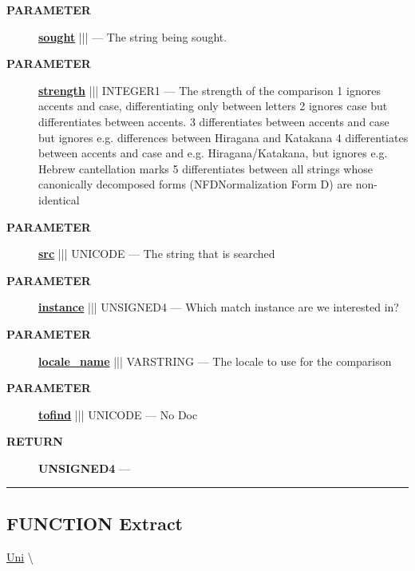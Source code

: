 \par
\begin{description}
\item [\colorbox{tagtype}{\color{white} \textbf{\textsf{PARAMETER}}}] \textbf{\underline{sought}} |||  --- The string being sought.
\item [\colorbox{tagtype}{\color{white} \textbf{\textsf{PARAMETER}}}] \textbf{\underline{strength}} ||| INTEGER1 --- The strength of the comparison 1 ignores accents and case, differentiating only between letters 2 ignores case but differentiates between accents. 3 differentiates between accents and case but ignores e.g. differences between Hiragana and Katakana 4 differentiates between accents and case and e.g. Hiragana/Katakana, but ignores e.g. Hebrew cantellation marks 5 differentiates between all strings whose canonically decomposed forms (NFDNormalization Form D) are non-identical
\item [\colorbox{tagtype}{\color{white} \textbf{\textsf{PARAMETER}}}] \textbf{\underline{src}} ||| UNICODE --- The string that is searched
\item [\colorbox{tagtype}{\color{white} \textbf{\textsf{PARAMETER}}}] \textbf{\underline{instance}} ||| UNSIGNED4 --- Which match instance are we interested in?
\item [\colorbox{tagtype}{\color{white} \textbf{\textsf{PARAMETER}}}] \textbf{\underline{locale\_name}} ||| VARSTRING --- The locale to use for the comparison
\item [\colorbox{tagtype}{\color{white} \textbf{\textsf{PARAMETER}}}] \textbf{\underline{tofind}} ||| UNICODE --- No Doc
\end{description}







\par
\begin{description}
\item [\colorbox{tagtype}{\color{white} \textbf{\textsf{RETURN}}}] \textbf{UNSIGNED4} --- 
\end{description}




\rule{\linewidth}{0.5pt}
\subsection*{\textsf{\colorbox{headtoc}{\color{white} FUNCTION}
Extract}}

\hypertarget{ecldoc:uni.extract}{}
\hspace{0pt} \hyperlink{ecldoc:Uni}{Uni} \textbackslash 

